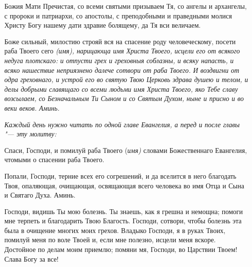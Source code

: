 \begin{mymulticols}
\inyne

Божия Мати Пречистая, со всеми святыми призываем Тя, со ангелы и архангелы, с пророки и патриархи, со апостолы, с преподобными и праведными молися Христу Богу нашему дати здравие болящему, да Тя вси величаем.




Боже сильный, милостию строяй вся на спасение роду человеческому, посети раба Твоего сего \itshape (имя), \normalfont{}нарицающа имя Христа Твоего, исцели его от всякого недуга плотскаго: и отпусти грех и греховныя соблазны, и всяку напасть, и всяко нашествие неприязнено далече сотвори от раба Твоего. И воздвигни от одра греховнаго, и устрой его во святую Твою Церковь здрава душею и телом, и делы добрыми славящаго со всеми людьми имя Христа Твоего, яко Тебе славу возсылаем, со Безначальным Ти Сыном и со Святым Духом, ныне и присно и во веки веков. Аминь.

\end{mymulticols}

\mychapterending[2]


\begin{mymulticols}
 


\itshape Каждый день нужно читать по одной главе Евангелия, а перед и после главы "--- эту молитву:\normalfont{}




Спаси, Господи, и помилуй раба Твоего {(\itshape имя)} словами Божественнаго Евангелия, чтомыми о спасении раба Твоего. 

Попали, Господи, терние всех его согрешений, и да вселится в него благодать Твоя, опаляющая, очищающая, освящающая всего человека во имя Отца и Сына и Святаго Духа. Аминь.




\end{mymulticols}

\mychapterending


\begin{mymulticols}
 


Господи, видишь Ты мою болезнь. Ты знаешь, как я грешна и немощна; помоги мне терпеть и благодарить Твою Благость. Господи, сотвори, чтобы болезнь эта была в очищение многих моих грехов. Владыко Господи, я в руках Твоих, помилуй меня по воле Твоей и, если мне полезно, исцели меня вскоре. Достойное по делам моим приемлю; помяни мя, Господи, во Царствии Твоем! Слава Богу за все!




\end{mymulticols}

